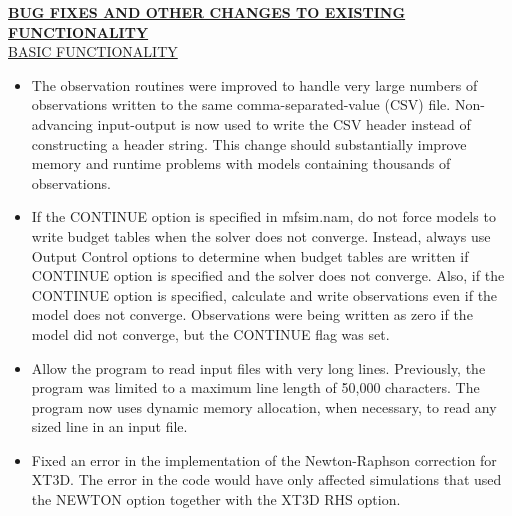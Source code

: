 \begin{itemize}
	\textbf{\underline{BUG FIXES AND OTHER CHANGES TO EXISTING FUNCTIONALITY}} \\
	\underline{BASIC FUNCTIONALITY}
	\begin{itemize}
		\item The observation routines were improved to handle very large numbers of observations written to the same comma-separated-value (CSV) file.  Non-advancing input-output is now used to write the CSV header instead of constructing a header string.   This change should substantially improve memory and runtime problems with models containing thousands of observations.
		\item If the CONTINUE option is specified in mfsim.nam, do not force models to write budget tables when the solver does not converge.  Instead, always use Output Control options to determine when budget tables are written if CONTINUE option is specified and the solver does not converge.  Also, if the CONTINUE option is specified, calculate and write observations even if the model does not converge.  Observations were being written as zero if the model did not converge, but the CONTINUE flag was set.
		\item Allow the program to read input files with very long lines.  Previously, the program was limited to a maximum line length of 50,000 characters.  The program now uses dynamic memory allocation, when necessary, to read any sized line in an input file.
		\item Fixed an error in the implementation of the Newton-Raphson correction for XT3D. The error in the code would have only affected simulations that used the NEWTON option together with the XT3D RHS option. 
	\end{itemize}


\end{itemize}
